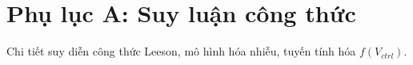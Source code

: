 \chapter{Phụ lục A: Suy luận công thức}
Chi tiết suy diễn công thức Leeson, mô hình hóa nhiễu, tuyến tính hóa \(f(V_{ctrl})\).


